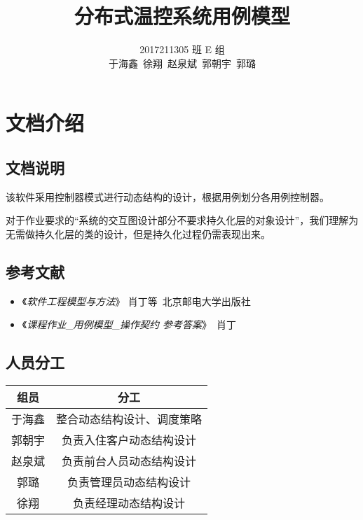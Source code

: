 \documentclass[black,normal,cn]{elegantnote}
\title{分布式温控系统用例模型}
\date{\zhtoday}
\begin{document}
\author{
    \begin{tabular}[t]{c}
        2017211305 班 E 组 \\
        于海鑫\ 徐翔\ 赵泉斌\ 郭朝宇\ 郭璐
    \end{tabular}
}
\maketitle

\tableofcontents

\section{文档介绍}

\subsection{文档说明}

该软件采用控制器模式进行动态结构的设计，根据用例划分各用例控制器。

对于作业要求的“系统的交互图设计部分不要求持久化层的对象设计”，我们理解为无需做持久化层的类的设计，但是持久化过程仍需表现出来。


\subsection{参考文献}

\begin{itemize}
    \item 《\emph{软件工程模型与方法}》 肖丁等\ 北京邮电大学出版社
    \item 《\emph{课程作业\_用例模型\_操作契约 参考答案}》\ 肖丁
\end{itemize}

\subsection{人员分工}

\begin{center}
    \begin{tabular}{cc}
        \toprule
        \textbf{组员} & \textbf{分工}              \\
        \midrule
        于海鑫        & 整合动态结构设计、调度策略 \\
        郭朝宇        & 负责入住客户动态结构设计   \\
        赵泉斌        & 负责前台人员动态结构设计   \\
        郭璐          & 负责管理员动态结构设计     \\
        徐翔          & 负责经理动态结构设计       \\
        \bottomrule
    \end{tabular}
\end{center}
\end{document}
